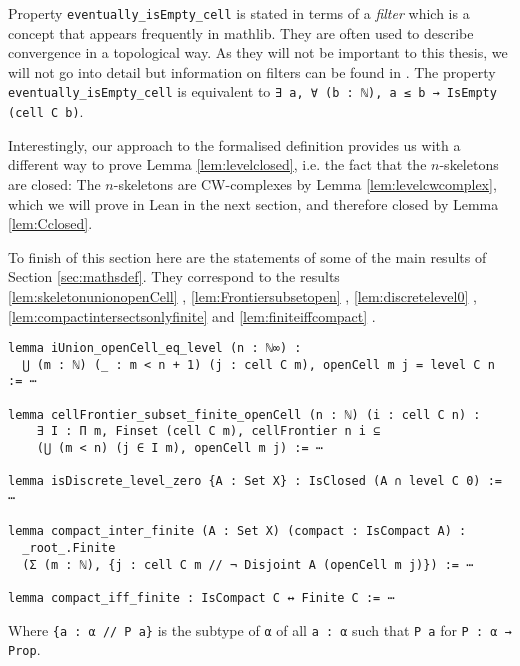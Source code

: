 Property \lstinline{eventually_isEmpty_cell} is stated in terms of a \emph{filter}
\href{https://github.com/leanprover-community/mathlib4/blob/ed125a4216d18273cb1b96d4c846d32b85d74faf/Mathlib/Order/Filter/Basic.lean#L85-L96}{\faExternalLink}
which is a concept that appears frequently in mathlib.
They are often used to describe convergence in a topological way.
As they will not be important to this thesis, we will not go into detail but information on filters can be found in \cite{Bourbaki1966}.
The property \lstinline{eventually_isEmpty_cell} is equivalent to \lstinline{∃ a, ∀ (b : ℕ), a ≤ b → IsEmpty (cell C b)}.

Interestingly, our approach to the formalised definition provides us with a different way to prove Lemma \ref{lem:levelclosed}, i.e. the fact that the $n$-skeletons are closed: 
The $n$-skeletons are CW-complexes by Lemma \ref{lem:levelcwcomplex}, which we will prove in Lean in the next section, and therefore closed by Lemma \ref{lem:Cclosed}.

To finish of this section here are the statements of some of the main results of Section \ref{sec:mathsdef}.
They correspond to the results \ref{lem:skeletonunionopenCell}
\href{https://github.com/scholzhannah/CWComplexes/blob/7be4872a05b534011cc969eb5b80a4b7f0bf57e2/CWcomplexes/Definition.lean#L320-L322}{\faExternalLink},
 \ref{lem:Frontiersubsetopen}
\href{https://github.com/scholzhannah/CWComplexes/blob/7be4872a05b534011cc969eb5b80a4b7f0bf57e2/CWcomplexes/Definition.lean#L420-L452}{\faExternalLink},
 \ref{lem:discretelevel0}
\href{https://github.com/scholzhannah/CWComplexes/blob/7be4872a05b534011cc969eb5b80a4b7f0bf57e2/CWcomplexes/Lemmas.lean#L108-L109}{\faExternalLink}, 
\ref{lem:compactintersectsonlyfinite} 
\href{https://github.com/scholzhannah/CWComplexes/blob/7be4872a05b534011cc969eb5b80a4b7f0bf57e2/CWcomplexes/Lemmas.lean#L111-L214}{\faExternalLink}
and \ref{lem:finiteiffcompact}
\href{https://github.com/scholzhannah/CWComplexes/blob/7be4872a05b534011cc969eb5b80a4b7f0bf57e2/CWcomplexes/Lemmas.lean#L298-L299}{\faExternalLink}.

\begin{lstlisting}
lemma iUnion_openCell_eq_level (n : ℕ∞) :
  ⋃ (m : ℕ) (_ : m < n + 1) (j : cell C m), openCell m j = level C n := ⋯

lemma cellFrontier_subset_finite_openCell (n : ℕ) (i : cell C n) :
    ∃ I : Π m, Finset (cell C m), cellFrontier n i ⊆
    (⋃ (m < n) (j ∈ I m), openCell m j) := ⋯

lemma isDiscrete_level_zero {A : Set X} : IsClosed (A ∩ level C 0) := ⋯

lemma compact_inter_finite (A : Set X) (compact : IsCompact A) :
  _root_.Finite
  (Σ (m : ℕ), {j : cell C m // ¬ Disjoint A (openCell m j)}) := ⋯

lemma compact_iff_finite : IsCompact C ↔ Finite C := ⋯
\end{lstlisting}

Where \lstinline|{a : α // P a}| is the subtype
\href{https://github.com/leanprover/lean4/blob/0edf1bac392f7e2fe0266b28b51c498306363a84/src/Init/Prelude.lean#L575-L590}{\faExternalLink}
of \lstinline{α} of all \lstinline{a : α} such that \lstinline{P a} for \lstinline{P : α → Prop}.
